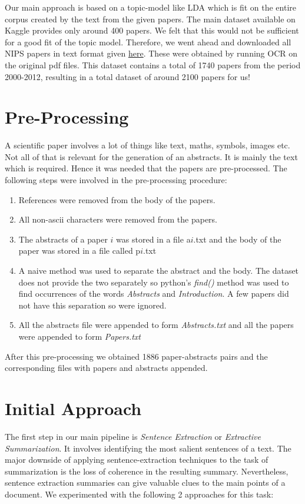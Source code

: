 Our main approach is based on a topic-model like LDA \cite{blei2003latent} which is fit on the entire corpus created by the text from the given papers. The main dataset available on Kaggle provides only around 400 papers. We felt that this would not be sufficient for a good fit of the topic model. Therefore, we went ahead and downloaded all NIPS papers in text format given \href{http://www.cs.nyu.edu/~roweis/data.html}{here}. These were obtained by running OCR on the original pdf files. This dataset contains a total of 1740 papers from the period 2000-2012, resulting in a total dataset of around 2100 papers for us!

\section{Pre-Processing}
A scientific paper involves a lot of things like text, maths, symbols, images etc. Not all of that is relevant for the generation of an abstracts. It is mainly the text which is required. Hence it was needed that the papers are pre-processed. The following steps were involved in the pre-processing procedure:
\begin{enumerate}
\item References were removed from the body of the papers.
\item All non-ascii characters were removed from the papers.
\item The abstracts of a paper $i$ was stored in a file a$i$.txt and the body of the paper was stored in a file called p$i$.txt 
\item A naive method was used to separate the abstract and the body. The dataset does not provide the two separately so python's \textit{find()} method was used to find occurrences of the words \textit{Abstracts} and \textit{Introduction}. A few papers did not have this separation so were ignored.
\item All the abstracts file were appended to form \textit{Abstracts.txt} and all the papers were appended to form \textit{Papers.txt}
\end{enumerate}
After this pre-processing we obtained 1886 paper-abstracts pairs and the corresponding files with papers and abstracts appended.

\section{Initial Approach}
The first step in our main pipeline is \textit{Sentence Extraction} or \textit{Extractive Summarization}. It involves identifying the most salient sentences of a text. The major downside of applying sentence-extraction techniques to the task of summarization is the loss of coherence in the resulting summary. Nevertheless, sentence extraction summaries can give valuable clues to the main points of a document. We experimented with the following 2 approaches for this task:
\newpage
